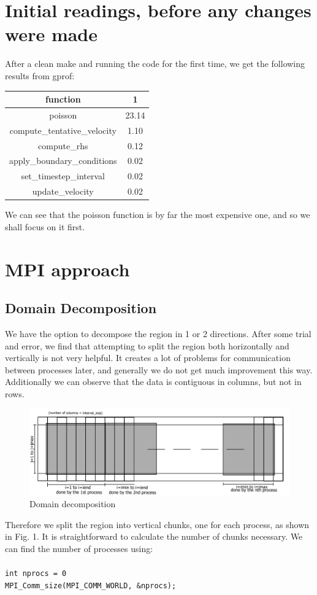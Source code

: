 \documentclass[11pt,journal]{article}
\newcommand\tab[1][1cm]{\hspace*{#1}}
\begin{document}
	\section{Initial readings, before any changes were made}
	After a clean make and running the code for the first time, we get the following results from gprof:
	\begin{table}[h]
		\centering
		\begin{tabular}{c|c}
			function & 1  \\
			\hline
			poisson & 23.14 \\
			compute\_tentative\_velocity & 1.10 \\
			compute\_rhs & 0.12 \\
			apply\_boundary\_conditions & 0.02 \\
			set\_timestep\_interval & 0.02 \\
			update\_velocity & 0.02\\
		\end{tabular}
	\end{table}

	We can see that the poisson function is by far the most expensive one, and so we shall focus on it first.
	
	\section{MPI approach}
	\subsection{Domain Decomposition}
	
	We have the option to decompose the region in 1 or 2 directions. After some trial and error, we find that attempting to split the region both horizontally and vertically is not very helpful. It creates a lot of problems for communication between processes later, and generally we do not get much improvement this way. Additionally we can observe that the data is contiguous in columns, but not in rows.
	
	\begin{figure}[h]
		\centering
		\includegraphics[scale=0.6]{HPC_diag1.png}
		\caption{Domain decomposition}
	\end{figure}
	Therefore we split the region into vertical chunks, one for each process, as shown in Fig. 1. It is straightforward to calculate the number of chunks necessary. We can find the number of processes using:\\
	\tab\\
	\tab \texttt{int nprocs = 0}\\
	\tab \texttt{MPI\_Comm\_size(MPI\_COMM\_WORLD, \&nprocs);}
	
\end{document}
